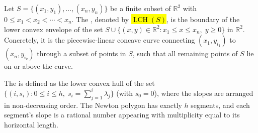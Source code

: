 \begin{definition} \label{definition:lower_convex_hull_of_a_finite_set_of_points}
    Let $S = \{(x_1, y_1), \dots, (x_n, y_n)\}$ be a finite subset of $\mathbb{R}^2$ with $0 \leq x_1 < x_2 < \cdots < x_n$. The , denoted by \hl{$\operatorname{LCH}(S)$}, is the boundary of the lower convex envelope of the set $S \cup \{(x, y) \in \mathbb{R}^2 : x_1 \leq x \leq x_n,\; y \geq 0\}$ in $\mathbb{R}^2$. Concretely, it is the piecewise-linear concave curve connecting $(x_1, y_{i_1})$ to $(x_n, y_{i_k})$ through a subset of points in $S$, such that all remaining points of $S$ lie on or above the curve.

    The  is defined as the lower convex hull of the set $\{(i, s_i) : 0 \leq i \leq h,\; s_i = \sum_{j=1}^i \lambda_j\}$ (with $s_0 = 0$), where the slopes are arranged in non-decreasing order. The Newton polygon has exactly $h$ segments, and each segment's slope is a rational number appearing with multiplicity equal to its horizontal length.
\end{definition}